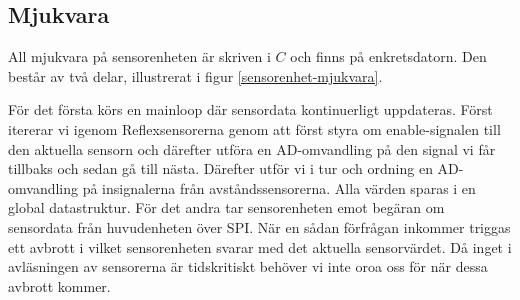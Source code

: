 \subsection{Mjukvara}

All mjukvara på sensorenheten är skriven i $C$ och finns på enkretsdatorn. Den består av två delar, illustrerat i figur \ref{sensorenhet-mjukvara}.


För det första körs en mainloop där sensordata kontinuerligt uppdateras. Först itererar vi igenom Reflexsensorerna genom att först styra om enable-signalen till den aktuella sensorn och därefter utföra en AD-omvandling på den signal vi får tillbaks och sedan gå till nästa. Därefter utför vi i tur och ordning en AD-omvandling på insignalerna från avståndssensorerna. Alla värden sparas i en global datastruktur.
\newline
För det andra tar sensorenheten emot begäran om sensordata från huvudenheten över SPI. När en sådan förfrågan inkommer triggas ett avbrott i vilket sensorenheten svarar med det aktuella sensorvärdet. Då inget i avläsningen av sensorerna är tidskritiskt behöver vi inte oroa oss för när dessa avbrott kommer.

